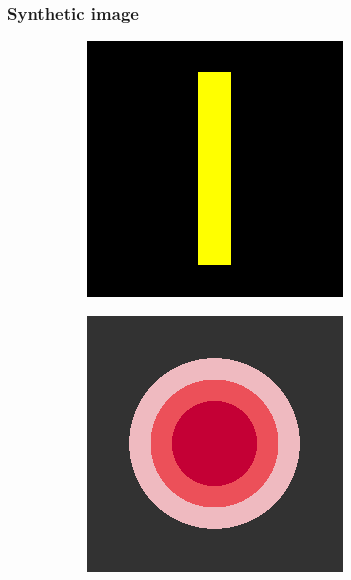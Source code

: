 \documentclass[xcolor=dvipsnames, xetex,serif]{beamer}
\begin{document}
    \begin{frame}
        \frametitle{Synthetic image}
        \begin{figure}[H]
            \centering
            \begin{subfigure}{0.15\linewidth}
                \centering
                \includegraphics[width=0.9\linewidth]{images/image_inpaint_synthetic/case01-original.png}
            \end{subfigure}
            \begin{subfigure}{0.15\linewidth}
                \centering
                \includegraphics[width=0.9\linewidth]{images/image_inpaint_synthetic/case02-original.png}

\end{subfigure}
\end{figure}
\end{frame}
\end{document}
